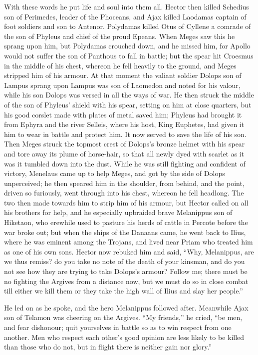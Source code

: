With these words he put life and soul into them all. Hector then killed
Schedius son of Perimedes, leader of the Phoceans, and Ajax killed
Laodamas captain of foot soldiers and son to Antenor. Polydamas killed
Otus of Cyllene a comrade of the son of Phyleus and chief of the proud
Epeans. When Meges saw this he sprang upon him, but Polydamas crouched
down, and he missed him, for Apollo would not suffer the son of Panthous
to fall in battle; but the spear hit Croesmus in the middle of his chest,
whereon he fell heavily to the ground, and Meges stripped him of his
armour. At that moment the valiant soldier Dolops son of Lampus sprang
upon Lampus was son of Laomedon and noted for his valour, while his son
Dolops was versed in all the ways of war. He then struck the middle of the
son of Phyleus’ shield with his spear, setting on him at close quarters,
but his good corslet made with plates of metal saved him; Phyleus had
brought it from Ephyra and the river Selleis, where his host, King
Euphetes, had given it him to wear in battle and protect him. It now
served to save the life of his son. Then Meges struck the topmost crest of
Dolops’s bronze helmet with his spear and tore away its plume of
horse-hair, so that all newly dyed with scarlet as it was it tumbled down
into the dust. While he was still fighting and confident of victory,
Menelaus came up to help Meges, and got by the side of Dolops unperceived;
he then speared him in the shoulder, from behind, and the point, driven so
furiously, went through into his chest, whereon he fell headlong. The two
then made towards him to strip him of his armour, but Hector called on all
his brothers for help, and he especially upbraided brave Melanippus son of
Hiketaon, who erewhile used to pasture his herds of cattle in Percote
before the war broke out; but when the ships of the Danaans came, he went
back to Ilius, where he was eminent among the Trojans, and lived near
Priam who treated him as one of his own sons. Hector now rebuked him and
said, “Why, Melanippus, are we thus remiss? do you take no note of the
death of your kinsman, and do you not see how they are trying to take
Dolops’s armour? Follow me; there must be no fighting the Argives from a
distance now, but we must do so in close combat till either we kill them
or they take the high wall of Ilius and slay her people.”

He led on as he spoke, and the hero Melanippus followed after. Meanwhile
Ajax son of Telamon was cheering on the Argives. “My friends,” he cried,
“be men, and fear dishonour; quit yourselves in battle so as to win
respect from one another. Men who respect each other’s good opinion are
less likely to be killed than those who do not, but in flight there is
neither gain nor glory.”

